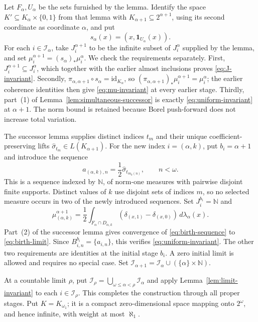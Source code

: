 \documentclass[a4paper,11pt]{amsart}
\theoremstyle{plain}
\theoremstyle{definition}
\theoremstyle{remark}
\newcommand{\N}{\mathbb N}
\newcommand{\one}{\mathbf 1}
\numberwithin{equation}{section}
\begin{document}
Let $F_\alpha,U_\alpha$ be the sets furnished by the lemma.  Identify the space $K'\subseteq K_\alpha\times\{0,1\}$ from that lemma with $K_{\alpha+1}\subseteq2^{\alpha+1}$, using its second coordinate as coordinate $\alpha$, and put
\[
 s_\alpha(x)=(x,\one_{U_\alpha}(x)).
\]
For each $i\in\mathcal I_\alpha$, take $J_i^{\alpha+1}$ to be the infinite subset of $J_i^\alpha$ supplied by the lemma, and set $\mu_i^{\alpha+1}=(s_\alpha)_*\mu_i^\alpha$.  We check the requirements separately.  First,
$J_i^{\alpha+1}\subseteq J_i^\alpha$, which together with the earlier almost inclusions proves \eqref{eq:J-invariant}.  Secondly,
$\pi_{\alpha,\alpha+1}\circ s_\alpha=\mathrm{id}_{K_\alpha}$, so
$(\pi_{\alpha,\alpha+1})_*\mu_i^{\alpha+1}=\mu_i^\alpha$; the earlier coherence identities then give \eqref{eq:mu-invariant} at every earlier stage.  Thirdly, part~(1) of Lemma~\ref{lem:simultaneous-successor} is exactly \eqref{eq:uniform-invariant} at $\alpha+1$.  The norm bound is retained because Borel push-forward does not increase total variation.

The successor lemma supplies distinct indices $t_m$ and their unique coefficient-preserving lifts $\widehat\sigma_{t_m}\in L(K_{\alpha+1})$.  For the new index $i=(\alpha,k)$, put $b_i=\alpha+1$ and introduce the sequence
\begin{equation}\label{eq:birth-sequence}
 a_{(\alpha,k),n}=
 \frac12\widehat\sigma_{t_{m_k(n)}},
 \qquad n<\omega.
\end{equation}
This is a sequence indexed by $\N$, of norm-one measures with pairwise disjoint finite supports.  Distinct values of $k$ use disjoint sets of indices $m$, so no selected measure occurs in two of the newly introduced sequences.  Set $J_i^{b_i}=\N$ and
\begin{equation}\label{eq:birth-limit}
 \mu_{(\alpha,k)}^{\alpha+1}
 =\frac12\int_{F_\alpha\cap D_{\alpha,k}}
  (\delta_{(x,1)}-\delta_{(x,0)})\,d\lambda_\alpha(x).
\end{equation}
Part~(2) of the successor lemma gives convergence of \eqref{eq:birth-sequence} to \eqref{eq:birth-limit}.  Since $B_{i,n}^{b_i}=\{a_{i,n}\}$, this verifies \eqref{eq:uniform-invariant}.  The other two requirements are identities at the initial stage $b_i$.  A zero initial limit is allowed and requires no special case.  Set $\mathcal I_{\alpha+1}=\mathcal I_\alpha\cup(\{\alpha\}\times\N)$.

At a countable limit $\rho$, put $\mathcal I_\rho=\bigcup_{\omega\leqslant\alpha<\rho}\mathcal I_\alpha$ and apply Lemma~\ref{lem:limit-invariant} to each $i\in\mathcal I_\rho$.  This completes the construction through all proper stages.  Put $K=K_{\omega_1}$; it is a compact zero-dimensional space mapping onto $2^\omega$, and hence infinite, with weight at most $\aleph_1$.
\end{document}
